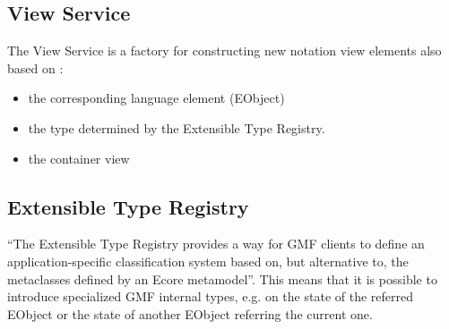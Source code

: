 \subsection{View Service}
The View Service is a factory for constructing new notation view elements also based on \cite{GMFDoc}:
\begin{itemize}
	\item the corresponding language element (EObject)
	\item the type determined by the Extensible Type Registry.
	\item the container view  
\end{itemize}

\subsection{Extensible Type Registry}
``The Extensible Type Registry provides a way for GMF clients to define an application-specific classification system based on, but alternative to, the metaclasses defined by an Ecore metamodel''\cite{GMFDoc}. This means that it is possible to introduce specialized GMF internal types, e.g. on the state of the referred EObject or the state of another EObject referring the current one.